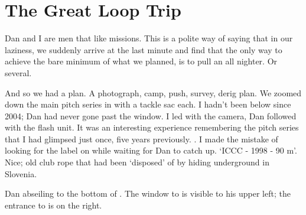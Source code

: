 \section{The Great Loop Trip}


Dan and I are men that like missions. This is a polite way of saying
that in our laziness, we suddenly arrive at the last minute and find
that the only way to achieve the bare minimum of what we planned, is to
pull an all nighter. Or several.

And so we had a plan. A photograph, camp, push, survey, derig plan. We
zoomed down the main pitch series in  with a tackle sac
each. I hadn't been below  since 2004; Dan had never gone
past the  window. I led with the camera, Dan
followed with the flash unit. It was an interesting experience
remembering the pitch series that I had glimpsed just once, five years
previously. . I made the mistake of looking
for the label on  while waiting for Dan to catch up.
`ICCC - 1998 - 90 m'. Nice; old club rope that had been `disposed' of by
hiding underground in Slovenia.


\begin{pagefigure}
\checkoddpage \ifoddpage \forcerectofloat \else \forceversofloat \fi
\centering
 \caption{Dan abseiling to the bottom of \protect{}. The window to \protect{} is visible to his upper left; the entrance to \protect{} is on the right. }
 \label{leopard friendship}
\end{pagefigure}


